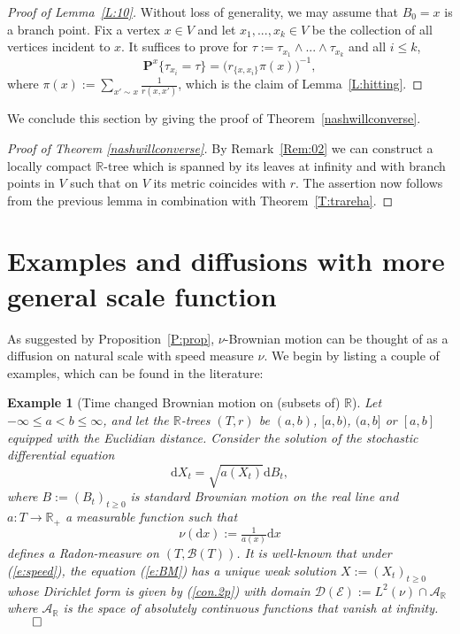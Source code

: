 \documentclass[11pt]{amsart}
\numberwithin{equation}{section}
\newtheorem{example}[definition]{Example}
\begin{document}
{\begin{proof}[Proof of Lemma~\ref{L:10}] Without loss of generality,  we may assume that $B_0=x$ is a branch point.
Fix a vertex $x\in V$ and let $x_1,...,x_k\in V$ be the collection of all vertices
incident to $x$. It suffices to prove for $\tau:=\tau_{x_1}\wedge ...\wedge\tau_{x_k}$
and all $i\leq k$,
\begin{equation}\label{e:09.1}
   \mathbf P^x\{\tau_{x_i}=\tau\}=\big(r_{\{x,x_i\}}\pi(x)\big)^{-1},
\end{equation}
where $\pi(x):=\sum_{x'\sim x}\tfrac{1}{r(x,x')}$,
which is the claim of Lemma~\ref{L:hitting}.
\end{proof}{\smallskip}

We conclude this section by giving the proof of Theorem~\ref{nashwillconverse}.

\begin{proof}[Proof of Theorem \ref{nashwillconverse}] By Remark~\ref{Rem:02} we can
construct a locally compact ${{\mathbb R}}$-tree which is spanned by its leaves at infinity and
with branch points in $V$ such that
on $V$ its metric coincides with $r$.
The
assertion now follows from the previous lemma in combination with
Theorem~\ref{T:trareha}.
\end{proof}\smallskip

\section{Examples and diffusions with more general scale function}
\label{s:BMdrift}

As suggested by Proposition~\ref{P:prop}, $\nu$-Brownian motion can be thought of as a diffusion on natural scale with speed measure $\nu$. We begin by listing a couple of examples, which can be found in the literature:

\begin{example}[Time changed Brownian motion on (subsets of) ${{\mathbb R}}$]\rm
Let $-\infty\le a<b\le\infty$, and let the ${{\mathbb R}}$-trees $(T,r)$ be $(a,b)$, $[a,b)$, $(a,b]$ or $[a,b]$ equipped with the Euclidian distance.
Consider the solution of the stochastic differential equation
\begin{equation}
\label{e:BM}
   \mathrm{d}X_t=\sqrt{a(X_t)}\mathrm{d}B_t,
\end{equation}
where $B:=(B_t)_{t\ge 0}$ is standard Brownian motion on the real line and $a:T\to{{\mathbb R}}_+$ a measurable function such that
\begin{equation}
\label{e:speed}
   \nu(\mathrm{d}x):=\tfrac{1}{a(x)}\mathrm{d}x
\end{equation}
defines a Radon-measure on $(T,{\mathcal B}(T))$. It is well-known that under (\ref{e:speed}), the equation (\ref{e:BM}) has a unique weak solution $X:=(X_t)_{t\ge 0}$
whose Dirichlet form is given by (\ref{con.2p}) with domain ${\mathcal D}({\mathcal E}):=L^2(\nu)\cap{\mathcal A}_{{\mathbb R}}$ where ${\mathcal A}_{{\mathbb R}}$ is the space of absolutely continuous functions that vanish at infinity.
\hfill$\qed$
\end{example}{\smallskip}

}
\end{document}
